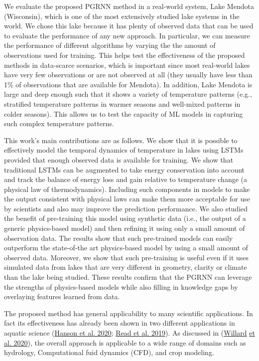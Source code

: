 \documentclass[book.tex]{subfiles}
\begin{document}
We evaluate the proposed PGRNN method in a real-world system, Lake
Mendota (Wisconsin), which is one of the most extensively studied lake
systems in the world. We chose this lake because it has plenty of
observed data that can be used to evaluate the performance of any new
approach. In particular, we can measure the performance of different
algorithms by varying the the amount of observations used for training.
This helps test the effectiveness of the proposed methods in data-scarce
scenarios, which is important since most real-world lakes have very few
observations or are not observed at all (they usually have less than 1\%
of observations that are available for Mendota). In addition, Lake
Mendota is large and deep enough such that it shows a variety of
temperature patterns (e.g., stratified temperature patterns in warmer
seasons and well-mixed patterns in colder seasons). This allows us to test
the capacity of ML models in capturing such complex temperature patterns.

This work's main contributions are as follows. We show that it is possible to
effectively model the temporal dynamics of temperature in lakes using
LSTMs provided that enough observed data is available for training. We
show that traditional LSTMs can be augmented to take energy conservation
into account and track the balance of energy loss and gain relative to
temperature change (a physical law of thermodynamics). Including such
components in models to make the output consistent with physical laws
can make them more acceptable for use by scientists and also may improve
the prediction performance. We also studied the benefit of
pre-training this model using synthetic data (i.e., the output of a
generic physics-based model) and then refining it using only a
small amount of observation data. The results show that such pre-trained
models can easily outperform the state-of-the art physics-based model by
using a small amount of observed data. Moreover, we show that such
pre-training is useful even if it uses simulated data from lakes that
are very different in geometry, clarity or climate than the lake being
studied. These results confirm that the PGRNN can leverage the
strengths of physics-based models while also filling in knowledge
gaps by overlaying features learned from data.

The proposed method has general applicability to many scientific
applications. In fact its effectiveness has already been shown in two
different applications in aquatic science
(\protect\hyperlink{page23}{Hanson et al. 2020};
\protect\hyperlink{page24}{Read et al. 2019}). As discussed in
(\protect\hyperlink{page24}{Willard} \protect\hyperlink{page24}{et al.
2020}), the overall approach is applicable to a wide range of domains
such as hydrology, Computational fuid dynamics (CFD), and crop modeling.
\end{document}
